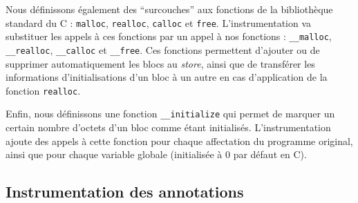 Nous définissons également des ``surcouches'' aux fonctions de la bibliothèque
standard du C : \lstinline'malloc', \lstinline'realloc', \lstinline'calloc' et
\lstinline'free'.
L'instrumentation va substituer les appels à ces fonctions par un appel à nos
fonctions : \lstinline'__malloc', \lstinline'__realloc', \lstinline'__calloc'
et \lstinline'__free'.
Ces fonctions permettent d'ajouter ou de supprimer automatiquement les blocs
au \textit{store}, ainsi que de transférer les informations d'initialisations
d'un bloc à un autre en cas d'application de la fonction \lstinline'realloc'.

Enfin, nous définissons une fonction \lstinline'__initialize' qui permet de
marquer un certain nombre d'octets d'un bloc comme étant initialisés.
L'instrumentation ajoute des appels à cette fonction pour chaque affectation du
programme original, ainsi que pour chaque variable globale (initialisée à 0 par
défaut en C).


\subsection{Instrumentation des annotations}


